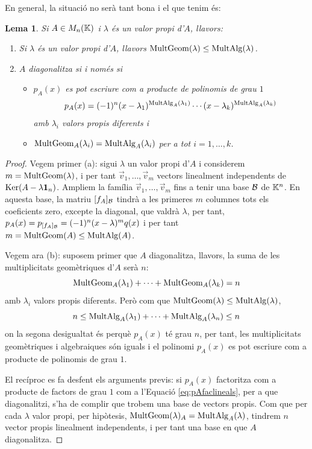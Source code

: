 \documentclass[
  11pt,
]{book}
\numberwithin{dummy}{section}
\theoremstyle{maincolornumbox}
\theoremstyle{blacknumex}
\theoremstyle{blacknumbox}
\theoremstyle{maincolornum}
\newtheorem{lemmaT}{Lema}[chapter]
\newenvironment{lemma}{\begin{pBox}\begin{lemmaT}}{\end{lemmaT}\end{pBox}}
\begin{document}
En general, la situació no serà tant bona i el que tenim és:

\begin{lemma}

Si \(A\in M_n(\mathbb{K})\) i \(\lambda\) és un valor propi d'\(A\), llavors:

\begin{enumerate}
\def\labelenumi{\arabic{enumi}.}
\item
  Si \(\lambda\) és un valor propi d'\(A\), llavors
  \(\operatorname{MultGeom}(\lambda)\leq \operatorname{MultAlg}(\lambda)\).
\item
  \(A\) diagonalitza si i només si

  \begin{itemize}
  \item
    \(p_A(x)\) es pot escriure com a producte de polinomis de grau \(1\)
    \begin{align*}
    \label{eq:pAfaclineals}
          p_A(x)=(-1)^n (x-\lambda_1)^{\operatorname{MultAlg}_A(\lambda_1)}\cdots(x-\lambda_k)^{\operatorname{MultAlg}_A(\lambda_k)} 
    \end{align*} amb \(\lambda_i\) valors propis diferents i
  \item
    \(\operatorname{MultGeom}_A(\lambda_i)=\operatorname{MultAlg}_A(\lambda_i)\) per a tot
    \(i=1,\dots, k\).
  \end{itemize}
\end{enumerate}

\end{lemma}

\begin{proof}
Vegem primer (a): sigui \(\lambda\) un valor propi d'\(A\) i
considerem \(m=\operatorname{MultGeom}(\lambda)\), i per tant
\(\vec v_1, \dots, \vec v_m\) vectors linealment independents de
\(\operatorname{Ker}(A-\lambda\mathbf{1}_n)\). Ampliem la família \(\vec v_1, \dots, \vec v_m\)
fins a tenir una base \(\mathcal{B}\) de \(\mathbb{K}^n\). En aquesta base, la matriu
\([f_A]_{\mathcal{B}}\) tindrà a les primeres \(m\) columnes tots els coeficients
zero, excepte la diagonal, que valdrà \(\lambda\), per tant,
\(p_A(x)=p_{[f_A]_{\mathcal{B}}}=(-1)^n(x-\lambda)^m q(x)\) i per tant
\(m=\operatorname{MultGeom}(A)\leq\operatorname{MultAlg}(A)\).

Vegem ara (b): suposem primer que \(A\) diagonalitza, llavors, la suma de
les multiplicitats geomètriques d'\(A\) serà \(n\):
\[\operatorname{MultGeom}_A(\lambda_1)+\cdots+\operatorname{MultGeom}_A(\lambda_k)=n\] amb
\(\lambda_i\) valors propis diferents. Però com que
\(\operatorname{MultGeom}(\lambda)\leq\operatorname{MultAlg}(\lambda)\),
\[n\leq \operatorname{MultAlg}_A(\lambda_1)+\cdots+\operatorname{MultAlg}_A(\lambda_n) \leq n\] on
la segona desigualtat és perquè \(p_A(x)\) té grau \(n\), per tant, les
multiplicitats geomètriques i algebraiques són iguals i el polinomi
\(p_A(x)\) es pot escriure com a producte de polinomis de grau \(1\).

El recíproc es fa desfent els arguments previs: si \(p_A(x)\) factoritza
com a producte de factors de grau \(1\) com a l'Equació
\eqref{eq:pAfaclineals}, per a que diagonalitzi, s'ha de complir
que trobem una base de vectors propis. Com que per cada \(\lambda\) valor
propi, per hipòtesis, \(\operatorname{MultGeom}(\lambda)_A=\operatorname{MultAlg}_A(\lambda)\),
tindrem \(n\) vector propis linealment independents, i per tant una base
en que \(A\) diagonalitza.
\end{proof}
\end{document}
